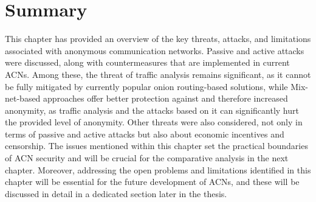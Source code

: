 \section{Summary}
This chapter has provided an overview of the key threats, attacks, and limitations associated with anonymous communication networks. Passive and active attacks were discussed, along with countermeasures that are implemented in current ACNs. Among these, the threat of traffic analysis remains significant, as it cannot be fully mitigated by currently popular onion routing-based solutions, while Mix-net-based approaches offer better protection against and therefore increased anonymity, as traffic analysis and the attacks based on it can significantly hurt the provided level of anonymity. Other threats were also considered, not only in terms of passive and active attacks but also about economic incentives and censorship. The issues mentioned within this chapter set the practical boundaries of ACN security and will be crucial for the comparative analysis in the next chapter. Moreover, addressing the open problems and limitations identified in this chapter will be essential for the future development of ACNs, and these will be discussed in detail in a dedicated section later in the thesis.
